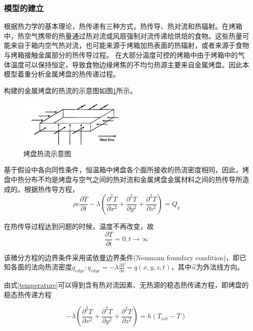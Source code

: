 \documentclass{my_paper}
\begin{document}
\subsubsection{模型的建立}
根据热力学的基本理论，热传递有三种方式，热传导、热对流和热辐射。在烤箱中，热空气携带的热量通过热对流或风扇强制对流传递给烘焙的食物。这些热量可能来自于箱内空气热对流，也可能来源于烤箱加热表面的热辐射，或者来源于食物与烤箱接触金属部分的热传导过程。\cite{sakin2009convection} 在大部分温度可控的烤箱中由于烤箱中的气体温度可以保持恒定，导致食物边缘烤焦的不均匀热源主要来自金属烤盘。因此本模型着重分析金属烤盘的热传递过程。

构建的金属烤盘的热流的示意图如图\ref{heatflow}所示。
\begin{figure}[h]
    \centering
    \includegraphics[width=0.5\textwidth]{heatflow.jpg}
    \caption{烤盘热流示意图}
    \label{heatflow}
\end{figure}

基于假设中各向同性条件，恒温箱中烤盘各个面所接收的热流密度相同，因此，烤盘中热分布不均是烤盘与空气之间的热对流和金属烤盘金属材料之间的热传导所造成的。根据热传导方程，
\begin{equation}
    \rho c \frac{\partial T}{\partial t}-\lambda (\frac{\partial^{2} T}{\partial x^{2}}+\frac{\partial^{2} T}{\partial y^{2}}+\frac{\partial^{2} T}{\partial z^{2}})= Q_{g}
    \label{heat_tranfer_equation}
\end{equation}

在热传导过程达到问题的时候，温度不再改变，故
\begin{equation}
    \frac{\partial T}{\partial t}=0,t \to \infty
    \label{temperature}
\end{equation}

该微分方程的边界条件采用诺依曼边界条件(Neumann foundary condition)，即已知各面的法向热流密度$q_{edge}:q_{edge}=-\lambda \frac{\partial T}{\partial n}=q(x,y,z,t)$，其中$\vec{n}$为外法线方向。


由式\ref{temperature}可以得到含有热对流因素、无热源的稳态热传递方程，即烤盘的稳态热传递方程

\begin{equation}
    -\lambda(\frac{\partial^{2} T}{\partial x^{2}}+\frac{\partial^{2} T}{\partial y^{2}}+\frac{\partial^{2} T}{\partial z^{2}})=h(T_{ext}-T)
    \label{pan_heat_transfer_equation}
\end{equation}
\end{document}

